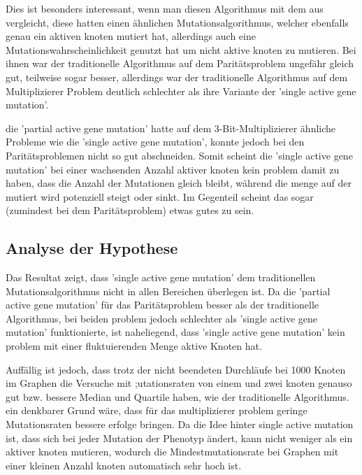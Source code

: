 Dies ist besonders interessant, wenn man diesen Algorithmus mit dem aus 
\cite{conf/eurogp/GoldmanP13}
vergleicht, diese hatten einen ähnlichen Mutationsalgorithmus, welcher ebenfalls genau ein aktiven knoten mutiert hat, allerdings auch eine Mutationswahrscheinlichkeit genutzt hat um nicht aktive knoten zu mutieren. Bei ihnen war der traditionelle Algorithmus auf dem Paritätsproblem ungefähr gleich gut, teilweise sogar besser, allerdings war der traditionelle Algorithmus auf dem Multiplizierer Problem deutlich schlechter als ihre Variante der 'single active gene mutation'. 


die 'partial active gene mutation' hatte auf dem 3-Bit-Multiplizierer ähnliche Probleme wie die 'single active gene mutation', konnte jedoch bei den Paritätsproblemen nicht so gut abschneiden. Somit scheint die 'single active gene mutation' bei einer wachsenden Anzahl aktiver knoten kein problem damit zu haben, dass die Anzahl der Mutationen gleich bleibt, während die menge auf der mutiert wird potenziell steigt oder sinkt. Im Gegenteil scheint das sogar (zumindest bei dem Paritätsproblem) etwas gutes zu sein. 

\subsection{Analyse der Hypothese}

Das Resultat zeigt, dass 'single active gene mutation' dem traditionellen Mutationsalgorithmus nicht in allen Bereichen überlegen ist. Da die 'partial active gene mutation' für das Paritätsproblem besser als der traditionelle Algorithmus, bei beiden problem jedoch schlechter als 'single active gene mutation' funktionierte, ist naheliegend, dass 'single active gene mutation' kein problem mit einer fluktuierenden Menge aktive Knoten hat. 

Auffällig ist jedoch, dass trotz der nicht beendeten Durchläufe bei 1000 Knoten im Graphen die Versuche mit ;utationsraten von einem und zwei knoten genauso gut bzw. bessere Median und Quartile haben, wie der traditionelle Algorithmus. ein denkbarer Grund wäre, dass für das multiplizierer problem geringe Mutationsraten bessere erfolge bringen. Da die Idee hinter single active mutation ist, dass sich bei jeder Mutation der Phenotyp ändert, kann nicht weniger als ein aktiver knoten mutieren, wodurch die Mindestmutationsrate bei Graphen mit einer kleinen Anzahl knoten automatisch sehr hoch ist.


